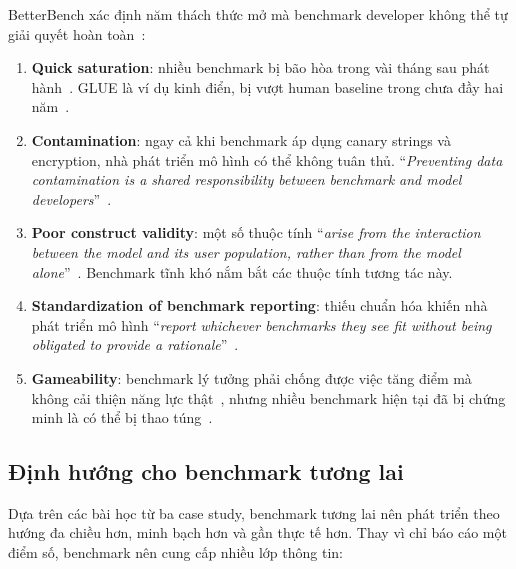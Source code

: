BetterBench xác định năm thách thức mở mà benchmark developer không thể tự giải quyết hoàn toàn~\cite{betterbench}:

\begin{enumerate}
    \item \textbf{Quick saturation}: nhiều benchmark bị bão hòa trong vài tháng sau phát hành~\cite{betterbench}. GLUE là ví dụ kinh điển, bị vượt human baseline trong chưa đầy hai năm~\cite{superglue}.

    \item \textbf{Contamination}: ngay cả khi benchmark áp dụng canary strings và encryption, nhà phát triển mô hình có thể không tuân thủ. ``\textit{Preventing data contamination is a shared responsibility between benchmark and model developers}''~\cite{betterbench}.

    \item \textbf{Poor construct validity}: một số thuộc tính ``\textit{arise from the interaction between the model and its user population, rather than from the model alone}''~\cite{betterbench}. Benchmark tĩnh khó nắm bắt các thuộc tính tương tác này.

    \item \textbf{Standardization of benchmark reporting}: thiếu chuẩn hóa khiến nhà phát triển mô hình ``\textit{report whichever benchmarks they see fit without being obligated to provide a rationale}''~\cite{betterbench}.

    \item \textbf{Gameability}: benchmark lý tưởng phải chống được việc tăng điểm mà không cải thiện năng lực thật~\cite{betterbench}, nhưng nhiều benchmark hiện tại đã bị chứng minh là có thể bị thao túng~\cite{betterbench}.
\end{enumerate}

\subsection{Định hướng cho benchmark tương lai}

Dựa trên các bài học từ ba case study, benchmark tương lai nên phát triển theo hướng đa chiều hơn, minh bạch hơn và gần thực tế hơn. Thay vì chỉ báo cáo một điểm số, benchmark nên cung cấp nhiều lớp thông tin:

